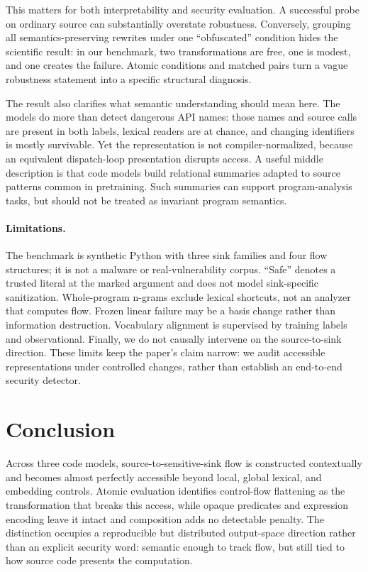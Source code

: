 \documentclass{article}
\begin{document}
This matters for both interpretability and security evaluation. A successful probe on ordinary source can substantially overstate robustness. Conversely, grouping all semantics-preserving rewrites under one ``obfuscated'' condition hides the scientific result: in our benchmark, two transformations are free, one is modest, and one creates the failure. Atomic conditions and matched pairs turn a vague robustness statement into a specific structural diagnosis.

The result also clarifies what semantic understanding should mean here. The models do more than detect dangerous API names: those names and source calls are present in both labels, lexical readers are at chance, and changing identifiers is mostly survivable. Yet the representation is not compiler-normalized, because an equivalent dispatch-loop presentation disrupts access. A useful middle description is that code models build relational summaries adapted to source patterns common in pretraining. Such summaries can support program-analysis tasks, but should not be treated as invariant program semantics.

\paragraph{Limitations.} The benchmark is synthetic Python with three sink families and four flow structures; it is not a malware or real-vulnerability corpus. ``Safe'' denotes a trusted literal at the marked argument and does not model sink-specific sanitization. Whole-program n-grams exclude lexical shortcuts, not an analyzer that computes flow. Frozen linear failure may be a basis change rather than information destruction. Vocabulary alignment is supervised by training labels and observational. Finally, we do not causally intervene on the source-to-sink direction. These limits keep the paper's claim narrow: we audit accessible representations under controlled changes, rather than establish an end-to-end security detector.

\section{Conclusion}
Across three code models, source-to-sensitive-sink flow is constructed contextually and becomes almost perfectly accessible beyond local, global lexical, and embedding controls. Atomic evaluation identifies control-flow flattening as the transformation that breaks this access, while opaque predicates and expression encoding leave it intact and composition adds no detectable penalty. The distinction occupies a reproducible but distributed output-space direction rather than an explicit security word: semantic enough to track flow, but still tied to how source code presents the computation.
\end{document}
